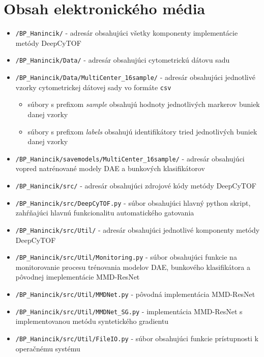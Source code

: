 \chapter{Obsah elektronického média}

\begin{itemize}
    \item \texttt{/BP_Hanincik/} - adresár obsahujúci všetky komponenty implementácie metódy DeepCyTOF
    \item \texttt{/BP_Hanincik/Data/} - adresár obsahujúci cytometrickú dátovu sadu
    \item \texttt{/BP_Hanincik/Data/MultiCenter_16sample/} - adresár obsahujúci jednotlivé vzorky cytometrickej dátovej sady vo formáte \texttt{csv}
    \begin{itemize}
        \item súbory s prefixom \textit{sample} obsahujú hodnoty jednotlivých markerov buniek danej vzorky
        \item súbory s prefixom \textit{labels} obsahujú identifikátory tried jednotlivých buniek danej vzorky
    \end{itemize}
    \item \texttt{/BP_Hanincik/savemodels/MultiCenter_16sample/} - adresár obsahujúci vopred natrénované modely DAE a bunkových klasifikátorov
    \item \texttt{/BP_Hanincik/src/} - adresár obsahujúci zdrojové kódy metódy DeepCyTOF
    \item \texttt{/BP_Hanincik/src/DeepCyTOF.py} - súbor obsahujúci hlavný python skript, zahŕňajúci hlavnú funkcionalitu automatického gatovania
    \item \texttt{/BP_Hanincik/src/Util/} - adresár obsahujúci jednotlivé komponenty metódy DeepCyTOF
    \item \texttt{/BP_Hanincik/src/Util/Monitoring.py} - súbor obsahujúci funkcie na monitorovanie procesu trénovania modelov DAE, bunkového klasifikátora a pôvodnej imeplementácie MMD-ResNet
    \item \texttt{/BP_Hanincik/src/Util/MMDNet.py} - pôvodná implementácia MMD-ResNet
    \item \texttt{/BP_Hanincik/src/Util/MMDNet_SG.py} - implementácia MMD-ResNet s implementovanou metódu syntetického gradientu
    \item \texttt{/BP_Hanincik/src/Util/FileIO.py} - súbor obsahujúci funkcie prístupnosti k operačnému systému

\end{itemize}
